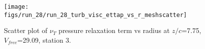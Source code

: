 \begin{figure}[H]
\centering
\texttt{[image: figs/run\_28/run\_28\_turb\_visc\_ettap\_vs\_r\_meshscatter]}
\caption{Scatter plot of $\nu_T$ pressure relaxation term vs radius at $z/c$=7.75, $V_{free}$=29.09, station 3.}
\label{fig:run_28_turb_visc_ettap_vs_r_meshscatter}
\end{figure}


